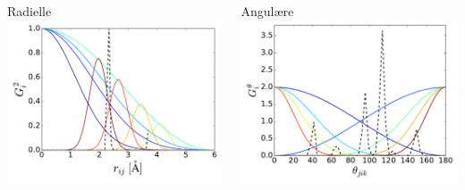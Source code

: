 \documentclass{beamer}
\begin{document}
\begin{frame}

\begin{columns} %
  \begin{column}{0.5\linewidth} %
   \centering
   Radielle
   \includegraphics[width=\linewidth]{../Figures/Presentation/SiInitialSymmG2.pdf}
  \end{column}
  \begin{column}{0.5\linewidth} %
   \centering
   Angulære
   \includegraphics[width=\linewidth]{../Figures/Results/SiInitialSymmG5.pdf}
  \end{column}
\end{columns}
 
\end{frame}
\end{document}
